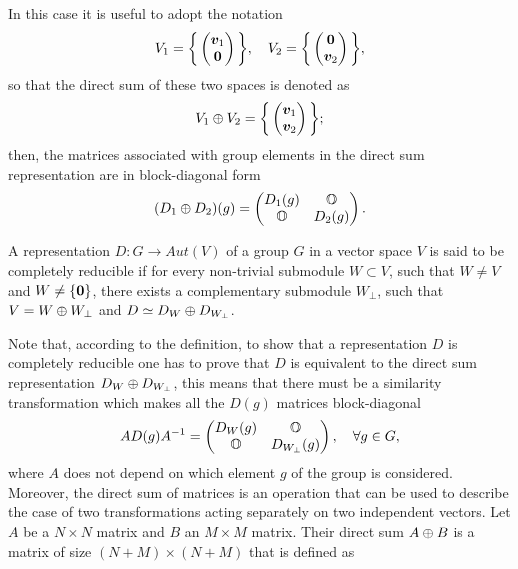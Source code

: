 In this case it is useful to adopt the notation 
\begin{equation}
    V_1 = \bigg\{
    \begin{pmatrix}
        \bm{v}_1 \\
        \bm{0}
    \end{pmatrix}
    \bigg\},\quad 
    V_2 = \bigg\{
    \begin{pmatrix}
        \bm{0} \\
        \bm{v}_2
    \end{pmatrix}
    \bigg\},
\end{equation}
so that the direct sum of these two spaces is denoted as
\begin{equation}
    V_1 \oplus V_2 = \bigg\{
    \begin{pmatrix}
        \bm{v}_1 \\
        \bm{v}_2
    \end{pmatrix}
    \bigg\};
\end{equation}
then, the matrices associated with group elements in the direct sum representation are in block-diagonal form
\begin{equation}
    (D_1 \oplus D_2)(g) = 
    \begin{pmatrix}
        D_1(g) & \mathbb{O} \\
        \mathbb{O} & D_2(g)
    \end{pmatrix}.
\end{equation}
\begin{defn}
    A representation $D : G \to Aut(V)$ of a group $G$ in a vector space $V$ is said to be completely reducible if for every non-trivial submodule $W \subset V$, such that $W \neq V$ and $W \neq \{\bm{0}\}$, there exists a complementary submodule $W_\perp$, such that $V = W \oplus W_\perp$ and $D \simeq D_W \oplus D_{W_\perp}$. 
\end{defn}
Note that, according to the definition, to show that a representation $D$ is completely reducible one has to prove that $D$ is equivalent to the direct sum representation $D_W \oplus D_{W_\perp}$, this means that there must be a similarity transformation which makes all the $D(g)$ matrices block-diagonal
\begin{equation}
    AD(g)A^{-1} = 
    \begin{pmatrix}
        D_W(g) & \mathbb{O} \\
        \mathbb{O} & D_{W_\perp}(g)
    \end{pmatrix},\quad \forall g \in G,
\end{equation}
where $A$ does not depend on which element $g$ of the group is considered. Moreover, the direct sum of matrices is an operation that can be used to describe the case of two transformations acting separately on two independent vectors. Let $A$ be a $N \times N$ matrix and $B$ an $M \times M$ matrix. Their direct sum $A \oplus B$ is a matrix of size $(N + M) \times (N + M)$ that is defined as
